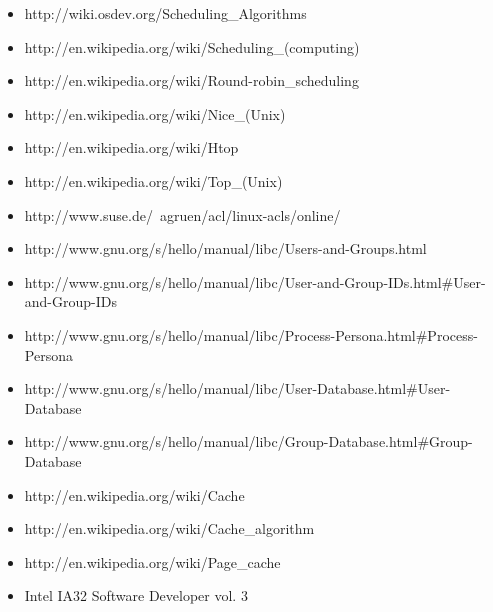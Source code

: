 \documentclass[a4paper,10pt]{article}
\begin{document}
\begin{itemize}
  \item http://wiki.osdev.org/Scheduling\_Algorithms
  \item http://en.wikipedia.org/wiki/Scheduling\_(computing)
  \item http://en.wikipedia.org/wiki/Round-robin\_scheduling
  \item http://en.wikipedia.org/wiki/Nice\_(Unix)
  \item http://en.wikipedia.org/wiki/Htop
  \item http://en.wikipedia.org/wiki/Top\_(Unix)
  \item http://www.suse.de/~agruen/acl/linux-acls/online/
  \item http://www.gnu.org/s/hello/manual/libc/Users-and-Groups.html
  \item http://www.gnu.org/s/hello/manual/libc/User-and-Group-IDs.html\#User-and-Group-IDs
  \item http://www.gnu.org/s/hello/manual/libc/Process-Persona.html\#Process-Persona
  \item http://www.gnu.org/s/hello/manual/libc/User-Database.html\#User-Database
  \item http://www.gnu.org/s/hello/manual/libc/Group-Database.html\#Group-Database
  \item http://en.wikipedia.org/wiki/Cache
  \item http://en.wikipedia.org/wiki/Cache\_algorithm
  \item http://en.wikipedia.org/wiki/Page\_cache 
  \item Intel IA32 Software Developer vol. 3
\end{itemize}
   
\end{document}
